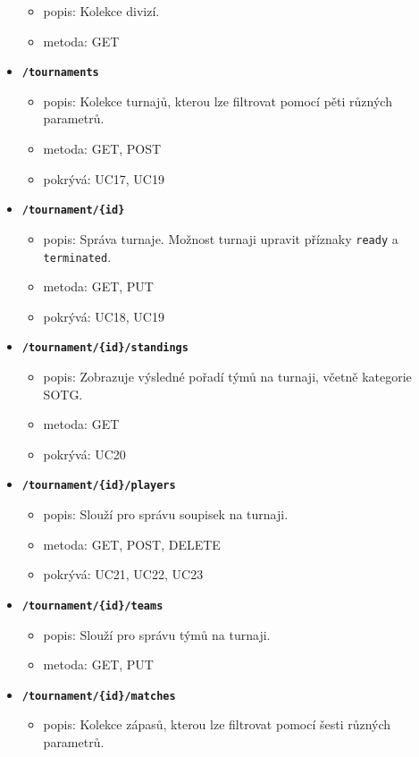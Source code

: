\begin{itemize}
\begin{itemize}
    \item popis: Kolekce divizí.
    \item metoda: GET
  \end{itemize}
  \item \texttt{\textbf{/tournaments}}
  \begin{itemize}
    \item popis: Kolekce turnajů, kterou lze filtrovat pomocí pěti různých parametrů.
    \item metoda: GET, POST
    \item pokrývá: UC17, UC19
  \end{itemize}
  \item \texttt{\textbf{/tournament/\{id\}}}
  \begin{itemize}
    \item popis: Správa turnaje. Možnost turnaji upravit příznaky \texttt{ready} a \texttt{terminated}.
    \item metoda: GET, PUT
    \item pokrývá: UC18, UC19
  \end{itemize}
  \item \texttt{\textbf{/tournament/\{id\}/standings}}
  \begin{itemize}
    \item popis: Zobrazuje výsledné pořadí týmů na turnaji, včetně kategorie SOTG.
    \item metoda: GET
    \item pokrývá: UC20
  \end{itemize}
  \item \texttt{\textbf{/tournament/\{id\}/players}}
  \begin{itemize}
    \item popis: Slouží pro správu soupisek na turnaji.
    \item metoda: GET, POST, DELETE
    \item pokrývá: UC21, UC22, UC23
  \end{itemize}
  \item \texttt{\textbf{/tournament/\{id\}/teams}}
  \begin{itemize}
    \item popis: Slouží pro správu týmů na turnaji.
    \item metoda: GET, PUT
  \end{itemize}
  \item \texttt{\textbf{/tournament/\{id\}/matches}}
  \begin{itemize}
    \item popis: Kolekce zápasů, kterou lze filtrovat pomocí šesti různých parametrů.

\end{itemize}
\end{itemize}
